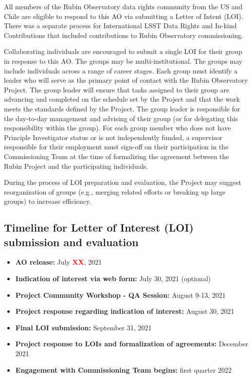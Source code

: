 \documentclass[SE,authoryear,toc,lsstdraft]{lsstdoc}
\newcommand{\FIXME}[1]{{\bf \textcolor{red}{#1}}}
\begin{document}
All members of the Rubin Observatory data rights community from the US and Chile  are eligible to respond to this AO via submitting a Letter of Intent (LOI). There was a separate process for International LSST Data Rights and In-kind Contributions that included contributions to Rubin Observatory commissioning.

Collaborating individuals are encouraged to submit a single LOI for their group in response to this AO. The groups may be multi-institutional. The groups may include individuals across a range of career stages. Each group must identify a leader who will serve as the primary point of contact with the Rubin Observatory Project. The group leader will ensure that tasks assigned to their group are advancing and completed on the schedule set by the Project and that the work meets the standards defined by the Project. The group leader is responsible for the day-to-day management and advising of their group (or for delegating this responsibility within the group). For each group member who does not have Principle Investigator status or is not independently funded, a supervisor responsible for their employment must sign-off on their participation in the Commissioning Team at the time of formalizing the agreement between the Rubin Project and the participating individuals.

During the process of LOI preparation and evaluation, the Project may suggest reorganization of groups (e.g., merging related efforts or breaking up large groups) to increase efficiency.

\subsection{Timeline for Letter of Interest (LOI) submission and evaluation}

\begin{itemize}
\item \textbf{AO release:} July \FIXME{XX}, 2021
\item \textbf{Indication of interest via web form:} July 30, 2021 (optional)
\item \textbf{Project Community Workshop - QA Session:} August 9-13, 2021
\item \textbf{Project response regarding indication of interest:} August 30, 2021
\item \textbf{Final LOI submission:} September 31, 2021
\item \textbf{Project response to LOIs and formalization of agreements:} December 2021
\item \textbf{Engagement with Commissioning Team begins:} first quarter 2022
\end{itemize}
\end{document}
